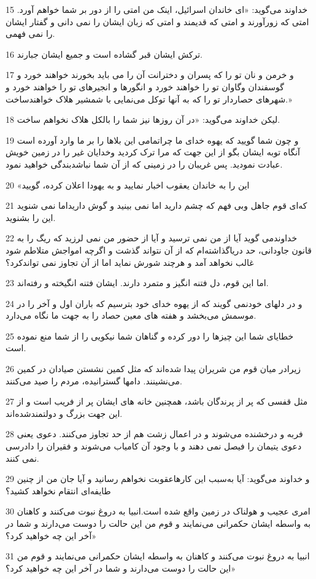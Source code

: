 \par 15 خداوند می‌گوید: «ای خاندان اسرائیل، اینک من امتی را از دور بر شما خواهم آورد. امتی که زورآورند و امتی که قدیمند و امتی که زبان ایشان را نمی دانی و گفتار ایشان را نمی فهمی.
\par 16 ترکش ایشان قبر گشاده است و جمیع ایشان جبارند.
\par 17 و خرمن و نان تو را که پسران و دخترانت آن را می باید بخورند خواهند خورد و گوسفندان وگاوان تو را خواهند خورد و انگورها و انجیرهای تو را خواهند خورد و شهرهای حصاردار تو را که به آنها توکل می‌نمایی با شمشیر هلاک خواهندساخت.»
\par 18 لیکن خداوند می‌گوید: «در آن روزها نیز شما را بالکل هلاک نخواهم ساخت.
\par 19 و چون شما گویید که یهوه خدای ما چراتمامی این بلاها را بر ما وارد آورده است آنگاه توبه ایشان بگو از این جهت که مرا ترک کردید وخدایان غیر را در زمین خویش عبادت نمودید. پس غریبان را در زمینی که از آن شما نباشدبندگی خواهید نمود.
\par 20 «این را به خاندان یعقوب اخبار نمایید و به یهودا اعلان کرده، گویید
\par 21 که‌ای قوم جاهل وبی فهم که چشم دارید اما نمی بینید و گوش داریداما نمی شنوید این را بشنوید.
\par 22 خداوندمی گوید آیا از من نمی ترسید و آیا از حضور من نمی لرزید که ریگ را به قانون جاودانی، حد دریاگذاشته‌ام که از آن نتواند گذشت و اگر‌چه امواجش متلاطم شود غالب نخواهد آمد و هرچند شورش نماید اما از آن تجاوز نمی تواندکرد؟
\par 23 اما این قوم، دل فتنه انگیز و متمرد دارند. ایشان فتنه انگیخته و رفته‌اند.
\par 24 و در دلهای خودنمی گویند که از یهوه خدای خود بترسیم که باران اول و آخر را در موسمش می‌بخشد و هفته های معین حصاد را به جهت ما نگاه می‌دارد.
\par 25 خطایای شما این چیزها را دور کرده و گناهان شما نیکویی را از شما منع نموده است.
\par 26 زیرادر میان قوم من شریران پیدا شده‌اند که مثل کمین نشستن صیادان در کمین می‌نشینند. دامها گسترانیده، مردم را صید می‌کنند.
\par 27 مثل قفسی که پر از پرندگان باشد، همچنین خانه های ایشان پر از فریب است و از این جهت بزرگ و دولتمندشده‌اند.
\par 28 فربه و درخشنده می‌شوند و در اعمال زشت هم از حد تجاوز می‌کنند. دعوی یعنی دعوی یتیمان را فیصل نمی دهند و با وجود آن کامیاب می‌شوند و فقیران را دادرسی نمی کنند.
\par 29 و خداوند می‌گوید: آیا به‌سبب این کارهاعقوبت نخواهم رسانید و آیا جان من از چنین طایفه‌ای انتقام نخواهد کشید؟
\par 30 امری عجیب و هولناک در زمین واقع شده است.انبیا به دروغ نبوت می‌کنند و کاهنان به واسطه ایشان حکمرانی می‌نمایند و قوم من این حالت را دوست می‌دارند و شما در آخر این چه خواهید کرد؟»
\par 31 انبیا به دروغ نبوت می‌کنند و کاهنان به واسطه ایشان حکمرانی می‌نمایند و قوم من این حالت را دوست می‌دارند و شما در آخر این چه خواهید کرد؟»
 
